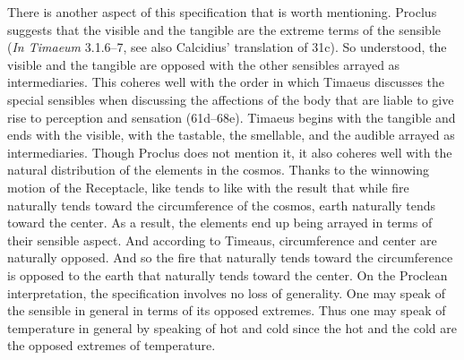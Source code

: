 There is another aspect of this specification that is worth mentioning. Proclus suggests that the visible and the tangible are the extreme terms of the sensible (\emph{In Timaeum} 3.1.6--7, see also Calcidius' translation of 31c). So understood, the visible and the tangible are opposed with the other sensibles arrayed as intermediaries. This coheres well with the order in which Timaeus discusses the special sensibles when discussing the affections of the body that are liable to give rise to perception and sensation (61d--68e). Timaeus begins with the tangible and ends with the visible, with the tastable, the smellable, and the audible arrayed as intermediaries. Though Proclus does not mention it, it also coheres well with the natural distribution of the elements in the cosmos. Thanks to the winnowing motion of the Receptacle, like tends to like with the result that while fire naturally tends toward the circumference of the cosmos, earth naturally tends toward the center. As a result, the elements end up being arrayed in terms of their sensible aspect. And according to Timeaus, circumference and center are naturally opposed. And so the fire that naturally tends toward the circumference is opposed to the earth that naturally tends toward the center. On the Proclean interpretation, the specification involves no loss of generality. One may speak of the sensible in general in terms of its opposed extremes. Thus one may speak of temperature in general by speaking of hot and cold since the hot and the cold are the opposed extremes of temperature.

